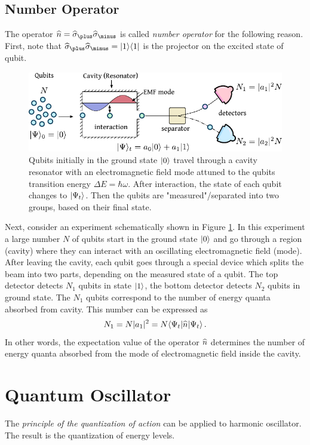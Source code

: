 \subsection{Number Operator}
The operator $\op{n}=\op{\sigma}_\plus \op{\sigma}_\minus$ is called \emph{number operator} for the following reason. First, note that $\op{\sigma}_\plus \op{\sigma}_\minus=\ketbra{1}{1}$ is the projector on the excited state of qubit.
\begin{figure}[htbp]
	\centering
	\includegraphics[scale=1.0]{qubitNumberOperatorMeaning}
	\caption{Qubits initially in the ground state $|{0}\rangle$ travel through a cavity resonator with an electromagnetic field mode attuned to the qubits transition energy $\Delta E=\hbar\omega$. After interaction, the state of each qubit changes to $|{\Psi_t}\rangle$. Then the qubits are "measured"/separated into two groups, based on their final state.}
	\label{fig:qubitNumberOperatorMeaning}
\end{figure}

Next, consider an experiment schematically shown in Figure \ref{fig:qubitNumberOperatorMeaning}. In this experiment a large number $N$ of qubits start in the ground state $|{0}\rangle$ and go through a region (cavity) where they can interact with an oscillating electromagnetic field (mode). After leaving the cavity, each qubit goes through a special device which splits the beam into two parts, depending on the measured state of a qubit. The top detector detects $N_1$ qubits in state $|{1}\rangle$, the bottom detector detects $N_2$ qubits in ground state. The $N_1$  qubits correspond to the number of energy quanta absorbed from cavity. This number can be expressed as
\[
N_1=N |a_1|^2=N\langle{\Psi_t}|\widehat{n}|{\Psi_t}\rangle\,.
\]  
In other words, the expectation value of the operator $\widehat{n}$ determines the number of energy quanta absorbed from the mode of electromagnetic field inside the cavity.
 

\section{Quantum Oscillator}\label{sec:QuantumOscillator}
The \emph{principle of the quantization of action} can be applied to harmonic oscillator. The result is the quantization of energy levels. 

